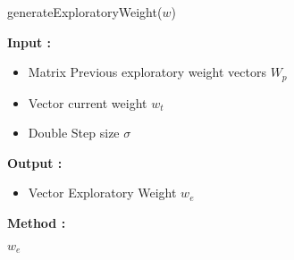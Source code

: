\documentclass{acm_proc_article-sp}
\begin{document}
\begin{algorithm}[t]
\caption{generateExploratoryWeight($w$)}
\begin{spacing}{0.9}
\begin{algorithmic}

\STATE \textbf{Input :} \begin{itemize}
\item Matrix Previous exploratory weight vectors $W_p$ 
\item Vector current weight $w_t$
\item Double Step size $\sigma$
 \end{itemize}
\STATE \textbf{Output :} \begin{itemize}
\item Vector Exploratory Weight $w_e$
 \end{itemize}
\STATE \textbf{Method :}
\begin{enumerate}
\RETURN $w_e$
\end{enumerate}
\end{algorithmic}
\end{spacing}
\label{clicksimulate}
\end{algorithm}
\end{document}
